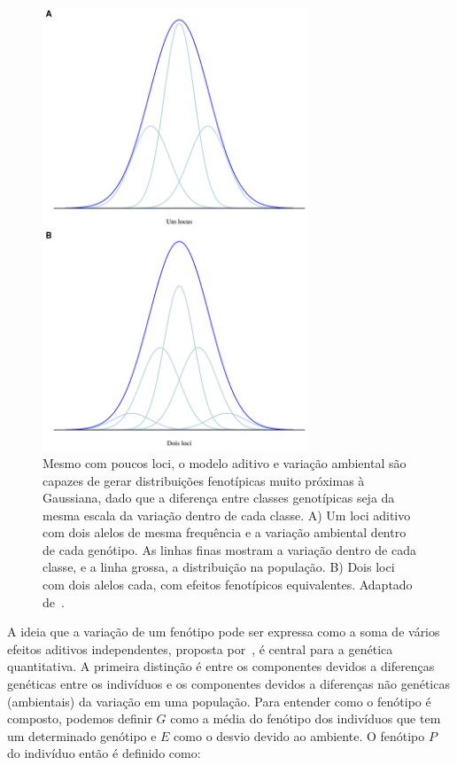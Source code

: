 \begin{refsection}
\begin{figure}
    \centering
    \includegraphics[width=300px]{discrete_gaussian.png}
    \caption[Variação contínua]{Mesmo com poucos loci, o modelo aditivo e variação ambiental são capazes de gerar distribuições fenotípicas muito próximas à Gaussiana, dado que a diferença entre classes genotípicas seja da mesma escala da variação dentro de cada classe. A) Um loci aditivo com dois alelos de mesma frequência e a variação ambiental dentro de cada genótipo. As linhas finas mostram a variação dentro de cada classe, e a linha grossa, a distribuição na população. B) Dois loci com dois alelos cada, com efeitos fenotípicos equivalentes. Adaptado de~\textcite{Barton2007-hq}.}
    \label{discrete_aleles}
\end{figure}

A ideia que a variação de um fenótipo pode ser expressa como a soma de vários
efeitos aditivos independentes, proposta por~\textcite{Fisher1918-rm}, é
central para a genética quantitativa. A primeira distinção é entre os
componentes devidos a diferenças genéticas entre os indivíduos e os componentes
devidos a diferenças não genéticas (ambientais) da variação em uma população.
Para entender como o fenótipo é composto, podemos definir $G$ como a média do
fenótipo dos indivíduos que tem um determinado genótipo e $E$ como o desvio
devido ao ambiente. O fenótipo $P$ do indivíduo então é definido como:


\end{refsection}

